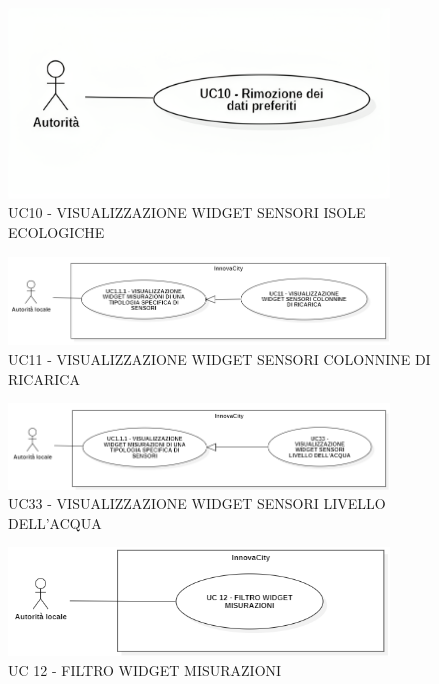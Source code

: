
\begin{figure}[H]
    \centering
    \includegraphics[width=0.9\textwidth]{../Images/uc10.png}
    \caption{UC10 - VISUALIZZAZIONE WIDGET SENSORI ISOLE ECOLOGICHE}
\end{figure}


\begin{figure}[H]
    \centering
    \includegraphics[width=0.9\textwidth]{../Images/uc11.PNG}
    \caption{UC11 - VISUALIZZAZIONE WIDGET SENSORI COLONNINE DI RICARICA}
\end{figure}



\begin{figure}[H]
    \centering
    \includegraphics[width=0.9\textwidth]{../Images/uc33.PNG}
    \caption{UC33 - VISUALIZZAZIONE WIDGET SENSORI LIVELLO DELL'ACQUA}
\end{figure}



\begin{figure}[H]
    \centering
    \includegraphics[width=0.9\textwidth]{../Images/uc12.PNG}
    \caption{UC 12 - FILTRO WIDGET MISURAZIONI}
\end{figure}


